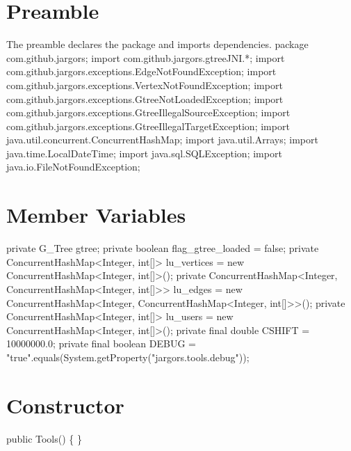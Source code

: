 \section{Preamble}
The preamble declares the package and imports dependencies.
\nwenddocs{}\endmoddef{}
package com.github.jargors;
import com.github.jargors.gtreeJNI.*;
import com.github.jargors.exceptions.EdgeNotFoundException;
import com.github.jargors.exceptions.VertexNotFoundException;
import com.github.jargors.exceptions.GtreeNotLoadedException;
import com.github.jargors.exceptions.GtreeIllegalSourceException;
import com.github.jargors.exceptions.GtreeIllegalTargetException;
import java.util.concurrent.ConcurrentHashMap;
import java.util.Arrays;
import java.time.LocalDateTime;
import java.sql.SQLException;
import java.io.FileNotFoundException;
\nwendcode{}\nwdocspar

\section{Member Variables}
\nwenddocs{}\endmoddef{}
private G_Tree gtree;
private boolean flag_gtree_loaded = false;
private ConcurrentHashMap<Integer, int[]> lu_vertices = new ConcurrentHashMap<Integer, int[]>();
private ConcurrentHashMap<Integer,
    ConcurrentHashMap<Integer, int[]>>    lu_edges    = new ConcurrentHashMap<Integer, ConcurrentHashMap<Integer, int[]>>();
private ConcurrentHashMap<Integer, int[]> lu_users    = new ConcurrentHashMap<Integer, int[]>();
private final double CSHIFT = 10000000.0;
private final boolean DEBUG = "true".equals(System.getProperty("jargors.tools.debug"));
\nwendcode{}\nwdocspar

\section{Constructor}
\nwenddocs{}\endmoddef{}
public Tools() \{ \}
\nwendcode{}\nwdocspar

